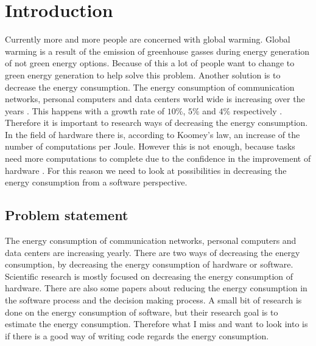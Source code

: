 \chapter{Introduction}
\label{ch:introduction}
Currently more and more people are concerned with global warming. Global warming is a result of the emission of greenhouse gasses during energy generation of not green energy options. Because of this a lot of people want to change to green energy generation to help solve this problem. Another solution is to decrease the energy consumption. The energy consumption of communication networks, personal computers and data centers world wide is increasing over the years \cite{van2014trends}. This happens with a growth rate of $10\%$, $5\%$ and $4\%$ respectively \cite{van2014trends}. Therefore it is important to research ways of decreasing the energy consumption. In the field of hardware there is, according to Koomey's law, an increase of the number of computations per Joule. However this is not enough, because tasks need more computations to complete due to the confidence in the improvement of hardware \cite{verdecchia2017estimating}. For this reason we need to look at possibilities in decreasing the energy consumption from a software perspective.


\section{Problem statement}
The energy consumption of communication networks, personal computers and data centers are increasing yearly. There are two ways of decreasing the energy consumption, by decreasing the energy consumption of hardware or software. Scientific research is mostly focused on decreasing the energy consumption of hardware. There are also some papers about reducing the energy consumption in the software process and the decision making process. A small bit of research is done on the energy consumption of software, but their research goal is to estimate the energy consumption. Therefore what I miss and want to look into is if there is a good way of writing code regards the energy consumption.

